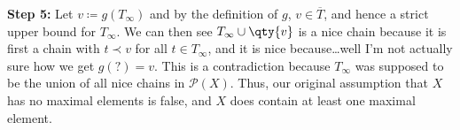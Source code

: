 \documentclass[boxes,pages,color=CornflowerBlue]{homework}
\begin{document}
\begin{solution}
    \textbf{Step 5:} Let $v\coloneqq g(T_\infty)$ and by the definition of $g$, $v\in \overline{T}$, and hence a strict upper bound for $T_\infty$.
    We can then see $T_\infty\cup \qty{v}$ is a nice chain because it is first a chain with $t\prec v$ for all $t\in T_\infty$, and it is nice because\dots well I'm not actually sure how we get $g(?) = v$.
    This is a contradiction because $T_\infty$ was supposed to be the union of all nice chains in $\mathcal{P}(X)$.
    Thus, our original assumption that $X$ has no maximal elements is false, and $X$ does contain at least one maximal element.

\end{solution}

\begin{problem}[$S$-formulas]
\end{problem}
\end{document}
